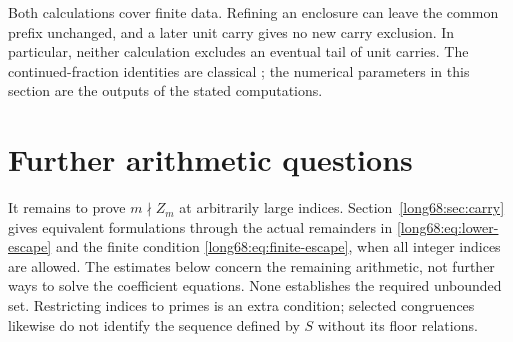 Both calculations cover finite data. Refining an enclosure can leave the
common prefix unchanged, and a later unit carry gives no new carry
exclusion. In particular, neither calculation excludes an eventual
tail of unit carries. The continued-fraction identities are classical
\cite[\S1.12(ii)]{nist-dlmf}; the numerical parameters in this section
are the outputs of the stated computations.

\section{Further arithmetic questions}\label{long68:sec:open}

It remains to prove $m\nmid Z_m$ at arbitrarily large indices.
Section~\ref{long68:sec:carry} gives equivalent formulations through the
actual remainders in \eqref{long68:eq:lower-escape} and the finite
condition \eqref{long68:eq:finite-escape}, when all integer indices are
allowed. The estimates below concern the remaining arithmetic, not further
ways to solve the coefficient equations. None establishes the required
unbounded set. Restricting indices to primes is an extra condition;
selected congruences likewise do not identify the sequence defined by
$S$ without its floor relations.

